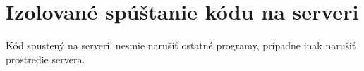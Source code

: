 \chapter{Izolované spúštanie kódu na serveri}

\label{kap:zakladne} %

Kód spustený na serveri, nesmie narušiť ostatné programy, prípadne inak narušiť prostredie servera.
